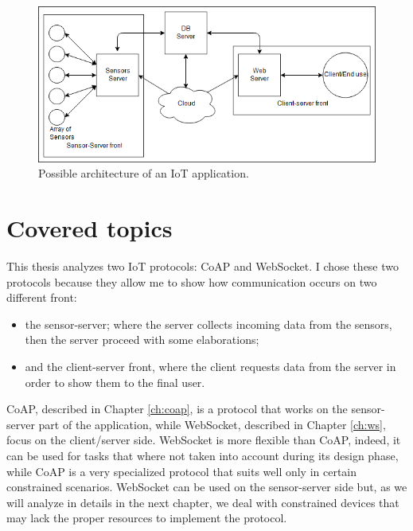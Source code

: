 	\begin{figure}
		\includegraphics[width=\linewidth]{intro-000.png}
		\caption{Possible architecture of an IoT application.}
		\label{fig:intro0}
	\end{figure}
	
	\section{Covered topics}
	
	This thesis analyzes two IoT protocols: CoAP and WebSocket.\newline
	I chose these two protocols because they allow me to show how communication occurs on two different front:
	\begin{itemize}
		\item the sensor-server; where the server collects incoming data from the sensors, then the server proceed with some elaborations;
		\item and the client-server front, where the client requests data from the server in order to show them to the final user.
	\end{itemize}

	CoAP, described in Chapter \ref{ch:coap}, is a protocol that works on the sensor-server part of the application, while WebSocket, described in Chapter \ref{ch:ws}, focus
	on the client/server side. WebSocket is more flexible than CoAP, indeed, it can be used for
	tasks that where not taken into account during its design phase, while CoAP is a very specialized
	protocol that suits well only in certain constrained scenarios.\newline
	WebSocket can be used on the sensor-server side but, as we will analyze in details in the next chapter,
	we deal with constrained devices that may lack the proper resources to implement the protocol.\newline
	
